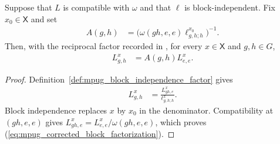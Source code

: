 \begin{lemma}
    \label{thm:mpug_block_factorization}
    \leanok
    Suppose that $L$ is compatible with $\omega$ and that $\ell$ is
    block-independent. Fix $x_0\in\mathsf X$ and set
    \begin{align}
        A(g,h)
         & =\bigl(\omega(gh,e,e)\ell^{x_0}_{g,h;h}\bigr)^{-1}.
        \label{eq:mpug_block_factor}
    \end{align}
    Then, with the reciprocal factor recorded in
    \cite{gap:fbc25_block_independence_reciprocal_errors}, for every
    $x\in\mathsf X$ and $g,h\in G$,
    \begin{align}
        L^x_{g,h}
         & =A(g,h)L^x_{e,e}.
        \label{eq:mpug_corrected_block_factorization}
    \end{align}
\end{lemma}

\begin{proof}\leanok
    Definition~\ref{def:mpug_block_independence_factor} gives
    \begin{align}
        L^x_{g,h}
         & =\frac{L^x_{gh,e}}{\ell^x_{g,h;h}}.
        \label{eq:mpug_block_factorization_first}
    \end{align}
    Block independence replaces $x$ by $x_0$ in the denominator.
    Compatibility at $(gh,e,e)$ gives
    $L^x_{gh,e}=L^x_{e,e}/\omega(gh,e,e)$, which proves
    (\ref{eq:mpug_corrected_block_factorization}).
\end{proof}

